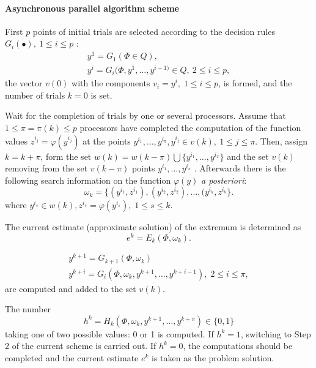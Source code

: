 \paragraph{Asynchronous parallel algorithm scheme}
\begin{description}
\item[\textbf{Step 1}]{First $p$ points of initial trials are selected according to the decision rules $G_i(\bullet ),\ 1\leq i\leq p$ :  
\begin{equation}
\label{eq:1_26}
\begin{gathered}
y^1=G_1(\Phi\in Q), \\
y^i=G_i(\Phi,y^1,\ldots,y^{i-1)}\in Q,\ 2\leq i\leq p,
\end{gathered}
\end{equation}
the vector $v(0)$  with the components $v_i=y^i,\;1\leq i\leq p$, is formed, and the number of trials $k=0$ is set.}
\item[\textbf{Step 2}]{Wait for the completion of trials by one or several processors. Assume that $1\leq \pi=\pi(k)\leq p$  processors have completed the computation of the function values $z^{i_j}=\varphi(y^{i_j})$  at the points $y^{i_1},\ldots,y^{i_\pi}, y^{i_j}\in v(k),\ 1\leq j\leq \pi$. Then, assign $k=k+\pi$, form the set $w(k)=w(k-\pi)\bigcup \{y^{i_1},\ldots,y^{i_\pi}\}$  and the set $v(k)$ removing from the set $v(k-\pi)$  points $y^{i_1},\ldots,y^{i_\pi}$ . Afterwards there is the following search information on the function $\varphi(y)$ \textit{a posteriori}:
\begin{equation}
\label{eq:1_27}
\omega_k=\{(y^{i_1},z^{i_1}),(y^{i_2},z^{i_2}),\ldots ,(y^{i_k},z^{i_k}\}.
\end{equation}
where  $y^{i_s}\in w(k),z^{i_s}=\varphi(y^{i_s}),\;1\leq s\leq k$.
}
\item[\textbf{Step 3}]{The current estimate (approximate solution) of the extremum is determined as  
\begin{equation}
\label{eq:1_28}
e^k=E_k(\Phi,\omega_k).
\end{equation}
}
\item[\textbf{Step 4}]{
\begin{equation}
\label{eq:1_29}
\begin{gathered}
y^{k+1}=G_{k+1}(\Phi,\omega_{k}) \\
y^{k+i}=G_i(\Phi,\omega_k,y^{k+1},\ldots,y^{k+i-1}),\;2\leq i\leq \pi,
\end{gathered}
\end{equation}
are computed and added to the set $v(k)$.} 
\item[\textbf{Step 5}]{The number 
\begin{equation}
\label{eq:1_30}
h^k=H_k(\Phi,\omega_k,y^{k+1},\ldots,y^{k+\pi})\in \{0,1\}
\end{equation}
taking one of two possible values: 0 or 1 is computed. If $h^k=1$, switching to Step 2 of the current scheme is carried out. If $h^k=0$, the computations should be completed and the current estimate $e^k$  is taken as the problem solution.}
\end{description}

